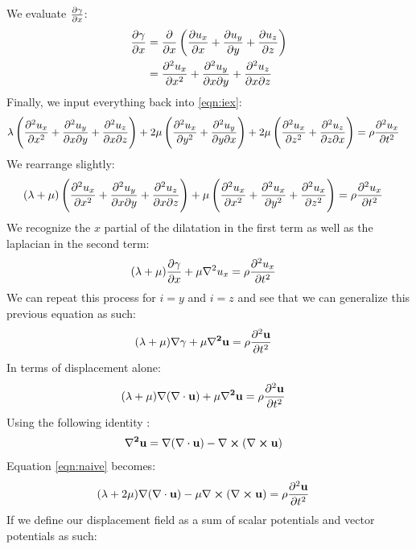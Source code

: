 We evaluate $\frac{\partial \gamma}{\partial x}$:
\begin{align*}
    \frac{\partial \gamma}{\partial x} &= \frac{\partial }{\partial x}\left(\frac{\partial u_x}{\partial x}+\frac{\partial u_y}{\partial y}+\frac{\partial u_z}{\partial z}\right)\\
    &= \frac{\partial ^2 u_x}{\partial x^2}+\frac{\partial ^2 u_y}{\partial x\partial y}+\frac{\partial ^2 u_z}{\partial x\partial z}
\end{align*}
Finally, we input everything back into \ref{eqn:iex}:
\begin{align}
    \lambda\left(\frac{\partial ^2 u_x}{\partial x^2}+\frac{\partial ^2 u_y}{\partial x\partial y}+\frac{\partial ^2 u_z}{\partial x\partial z}\right)+2\mu\left(\frac{\partial ^2u_x}{\partial y^2}+\frac{\partial ^2u_y}{\partial y\partial x}\right)+2\mu\left(\frac{\partial ^2u_x}{\partial z^2}+\frac{\partial ^2u_z}{\partial z\partial x}\right) &= \rho\frac{\partial ^2u_x}{\partial t^2}
\end{align}
We rearrange slightly:
\begin{align*}
    (\lambda+\mu)\left(\frac{\partial ^2 u_x}{\partial x^2}+\frac{\partial ^2 u_y}{\partial x\partial y}+\frac{\partial ^2 u_z}{\partial x\partial z}\right)+\mu\left(\frac{\partial ^2 u_x}{\partial x^2}+\frac{\partial ^2 u_x}{\partial y^2}+\frac{\partial ^2 u_x}{\partial z^2}\right)&= \rho\frac{\partial ^2u_x}{\partial t^2}
\end{align*}
We recognize the $x$ partial of the dilatation in the first term as well as the laplacian in the second term:
\begin{align}
    (\lambda+\mu)\frac{\partial \gamma}{\partial x}+\mu\nabla^2 u_x&= \rho\frac{\partial ^2u_x}{\partial t^2}
\end{align}
We can repeat this process for $i=y$ and $i=z$ and see that we can generalize this previous equation as such:
\begin{align}
    (\lambda+\mu)\vb{\nabla \gamma}+\mu\vb{\nabla^2 u} &= \rho\frac{\partial ^2 \vb{u}}{\partial t^2}
\end{align}
In terms of displacement alone:
\begin{align}
    \label{eqn:naive}
    (\lambda+\mu)\vb{\nabla(\nabla\cdot u)}+\mu\vb{\nabla^2 u} &= \rho\frac{\partial ^2 \vb{u}}{\partial t^2}
\end{align}
Using the following identity \cite[54]{stein2009introduction}:
\begin{align}
    \label{eqn:id1}
    \vb{\nabla^2 u} &= \vb{\nabla(\nabla\cdot u)-\nabla\cross(\nabla\cross u)}
\end{align}
Equation \ref{eqn:naive} becomes:
\begin{align}
    (\lambda+2\mu)\vb{\nabla(\nabla\cdot u)}-\mu\vb{\nabla\cross(\nabla\cross u)} &= \rho\frac{\partial ^2 \vb{u}}{\partial t^2}
\end{align}
If we define our displacement field as a sum of scalar potentials and vector potentials as such:

